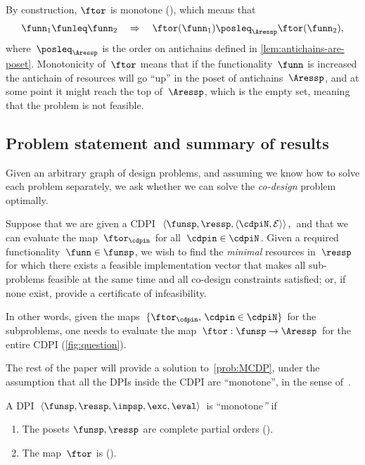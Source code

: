 By construction, $\ftor$ is monotone (), which
means that
\[
\funn_{1}\funleq\funn_{2}\quad\Rightarrow\quad\ftor(\funn_{1})\posleq_{\Aressp}\ftor(\funn_{2}),
\]
where~$\posleq_{\Aressp}$ is the order on antichains defined in
\cref{lem:antichains-are-poset}. Monotonicity of~$\ftor$ means that
if the functionality~$\funn$ is increased the antichain of resources
will go ``up'' in the poset of antichains~$\Aressp$, and at some
point it might reach the top of~$\Aressp$, which is the empty set,
meaning that the problem is not feasible.





\subsection{Problem statement and summary of results\label{sec:Optimization}}

Given an arbitrary graph of design problems, and assuming we know
how to solve each problem separately, we ask whether we can solve
the \emph{co-design} problem optimally. 
\begin{problem}
\label{prob:MCDP}Suppose that we are given a CDPI~$\left\langle \funsp,\ressp,\left\langle \cdpiN,\mathcal{E}\right\rangle \right\rangle ,$
and that we can evaluate the map~$\ftor_{\cdpin}$ for all~$\cdpin\in\cdpiN$.
Given a required functionality~$\funn\in\funsp$, we wish to find
the \emph{minimal} resources in~$\ressp$ for which there exists
a feasible implementation vector that makes all sub-problems feasible
at the same time and all co-design constraints satisfied; or, if
none exist, provide a certificate of infeasibility. 
\end{problem}
In other words, given the maps~$\{\ftor_{\cdpin},\,\cdpin\in\cdpiN\}$
for the subproblems, one needs to evaluate the map~$\ftor:\funsp\rightarrow\Aressp$
for the entire CDPI (\cref{fig:question}). 


The rest of the paper will provide a solution to~\cref{prob:MCDP},
under the assumption that all the DPIs inside the CDPI are ``monotone'',
in the sense of~.
\begin{definition}
\label{def:DPI-monotone}A DPI $\left\langle \funsp,\ressp,\impsp,\exc,\eval\right\rangle $
is ``monotone\emph{''} if
\begin{enumerate}
\item The posets $\funsp,\ressp$ are complete partial orders ().
\item The map~$\ftor$ is \scottcontinuous ().
\end{enumerate}
\end{definition}


